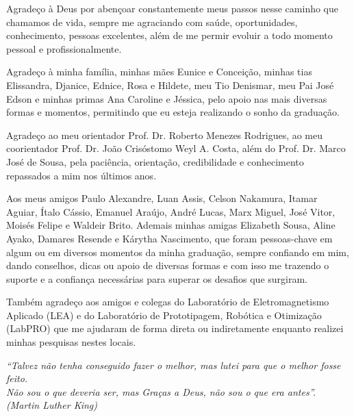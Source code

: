 \documentclass[
	12pt,				%
	openright,			%
	oneside,			%
	a4paper,			%
	english,			%
	brazil				%
	]{abntex2}
\begin{document}
\begin{agradecimentos}
Agradeço à Deus por abençoar constantemente meus passos nesse caminho que chamamos de vida, sempre me agraciando com saúde, oportunidades, conhecimento, pessoas excelentes, além de me permir evoluir a todo momento pessoal e profissionalmente.

Agradeço à minha família, minhas mães Eunice e Conceição, minhas tias Elissandra, Djanice, Ednice, Rosa e Hildete, meu Tio Denismar, meu Pai José Edson e minhas primas Ana Caroline e Jéssica, pelo apoio nas mais diversas formas e momentos, permitindo que eu esteja realizando o sonho da graduação. 

Agradeço ao meu orientador Prof. Dr. Roberto Menezes Rodrigues, ao meu coorientador Prof. Dr. João Crisóstomo Weyl A. Costa, além do Prof. Dr. Marco José de Sousa, pela paciência, orientação, credibilidade e conhecimento repassados a mim nos últimos anos.

Aos meus amigos Paulo Alexandre, Luan Assis, Celson Nakamura, Itamar Aguiar, Ítalo Cássio, Emanuel Araújo, André Lucas, Marx Miguel, José Vitor, Moisés Felipe e Waldeir Brito. Ademais minhas amigas Elizabeth Sousa, Aline Ayako, Damares Resende e Kárytha Nascimento, que foram pessoas-chave em algum ou em diversos momentos da minha graduação, sempre confiando em mim, dando conselhos, dicas ou apoio de diversas formas e com isso me trazendo o suporte e a confiança necessárias para superar os desafios que surgiram.

	Também agradeço aos amigos e colegas do Laboratório de Eletromagnetismo Aplicado (LEA) e do Laboratório de Prototipagem, Robótica e Otimização (LabPRO) que me ajudaram de forma direta ou indiretamente enquanto realizei minhas pesquisas nestes locais.


\end{agradecimentos}

\begin{epigrafe}
    \vspace*{\fill}
	\begin{flushright}
		\textit{``Talvez não tenha conseguido fazer o melhor, mas lutei para que o melhor fosse feito. \\ Não sou o que deveria ser, mas Graças a Deus, não sou o que era antes''. \\ (Martin Luther King)}
	\end{flushright}
\end{epigrafe}
\end{document}
